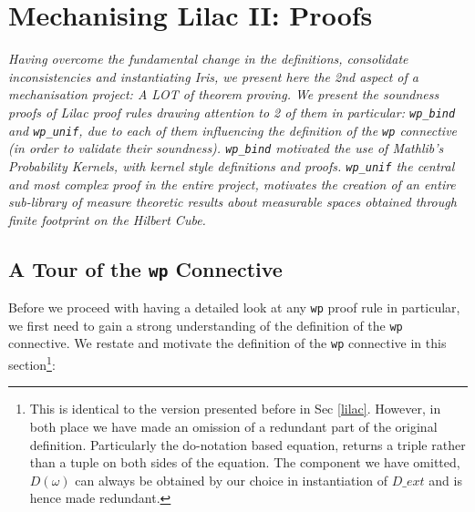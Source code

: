 \chapter{Mechanising Lilac II: Proofs}
\label{chap:proofs}
\emph{Having overcome the fundamental change in the definitions, consolidate inconsistencies and instantiating Iris, we present here the 2nd aspect
of a mechanisation project: A LOT of theorem proving. We present the soundness proofs of Lilac proof rules drawing attention to 2 of them
in particular: \texttt{wp\_bind} and \texttt{wp\_unif}, due to each of them influencing the definition of the \texttt{wp}
connective (in order to validate their soundness). \texttt{wp\_bind} motivated the use of Mathlib's Probability Kernels, with kernel style definitions
and proofs. \texttt{wp\_unif} the central and most complex proof in the entire project, motivates the creation of an entire sub-library of
measure theoretic results about measurable spaces obtained through finite footprint on the Hilbert Cube.}



\section{A Tour of the \texttt{wp} Connective}
\label{sec:wp}
Before we proceed with having a detailed look at any \texttt{wp} proof rule in particular, we first need to gain a strong understanding of the definition of
the \texttt{wp} connective.  We restate and motivate the definition of the \texttt{wp} connective in this
section\footnote{This is identical to the version presented before in Sec \ref{lilac}. However, in both place we have made an omission of a redundant part
of the original definition. Particularly the do-notation based equation, returns a triple rather than a tuple on both sides of the equation. The component
we have omitted, $D(\omega)$ can always be obtained by our choice in instantiation of $D\_ext$ and is hence made redundant.}:

